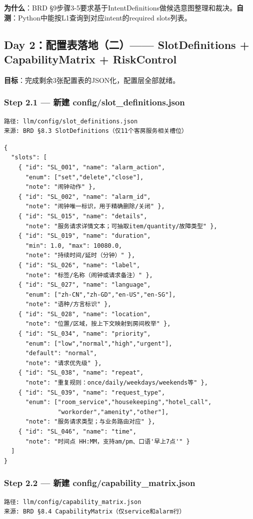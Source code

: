 \documentclass[12pt,a4paper]{ctexart}
\begin{document}
\textbf{为什么}：BRD §9步骤3-5要求基于IntentDefinitions做候选意图整理和裁决。\textbf{自测}：Python中能按L1查询到对应intent的required slots列表。

\newpage

\subsection{Day 2：配置表落地（二）—— SlotDefinitions + CapabilityMatrix + RiskControl}

\textbf{目标}：完成剩余3张配置表的JSON化，配置层全部就绪。

\subsubsection*{Step 2.1 — 新建 config/slot\_definitions.json}
\begin{verbatim}
路径: llm/config/slot_definitions.json
来源: BRD §8.3 SlotDefinitions（仅11个客房服务相关槽位）
\end{verbatim}

{\small
\begin{verbatim}
{
  "slots": [
    { "id": "SL_001", "name": "alarm_action",
      "enum": ["set","delete","close"],
      "note": "闹钟动作" },
    { "id": "SL_002", "name": "alarm_id",
      "note": "闹钟唯一标识，用于精确删除/关闭" },
    { "id": "SL_015", "name": "details",
      "note": "服务请求详情文本；可抽取item/quantity/故障类型" },
    { "id": "SL_019", "name": "duration",
      "min": 1.0, "max": 10080.0,
      "note": "持续时间/延时（分钟）" },
    { "id": "SL_026", "name": "label",
      "note": "标签/名称（闹钟或请求备注）" },
    { "id": "SL_027", "name": "language",
      "enum": ["zh-CN","zh-GD","en-US","en-SG"],
      "note": "语种/方言标识" },
    { "id": "SL_028", "name": "location",
      "note": "位置/区域，按上下文映射到房间枚举" },
    { "id": "SL_034", "name": "priority",
      "enum": ["low","normal","high","urgent"],
      "default": "normal",
      "note": "请求优先级" },
    { "id": "SL_038", "name": "repeat",
      "note": "重复规则：once/daily/weekdays/weekends等" },
    { "id": "SL_039", "name": "request_type",
      "enum": ["room_service","housekeeping","hotel_call",
               "workorder","amenity","other"],
      "note": "服务请求类型；与业务路由对应" },
    { "id": "SL_046", "name": "time",
      "note": "时间点 HH:MM，支持am/pm、口语'早上7点'" }
  ]
}
\end{verbatim}
}

\subsubsection*{Step 2.2 — 新建 config/capability\_matrix.json}
\begin{verbatim}
路径: llm/config/capability_matrix.json
来源: BRD §8.4 CapabilityMatrix（仅service和alarm行）
\end{verbatim}
\end{document}
